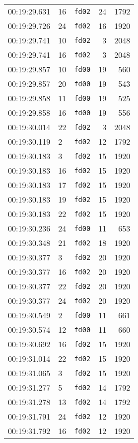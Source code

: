 \documentclass{article}
\begin{document}
\begin{longtable}{lllrr}
00:19:29.631 & 16 & \texttt{fd02} & 24 & 1792 \\
00:19:29.726 & 24 & \texttt{fd02} & 16 & 1920 \\
00:19:29.741 & 10 & \texttt{fd02} & 3 & 2048 \\
00:19:29.741 & 16 & \texttt{fd02} & 3 & 2048 \\
00:19:29.857 & 10 & \texttt{fd00} & 19 & 560 \\
00:19:29.857 & 20 & \texttt{fd00} & 19 & 543 \\
00:19:29.858 & 11 & \texttt{fd00} & 19 & 525 \\
00:19:29.858 & 16 & \texttt{fd00} & 19 & 556 \\
00:19:30.014 & 22 & \texttt{fd02} & 3 & 2048 \\
00:19:30.119 & 2 & \texttt{fd02} & 12 & 1792 \\
00:19:30.183 & 3 & \texttt{fd02} & 15 & 1920 \\
00:19:30.183 & 16 & \texttt{fd02} & 15 & 1920 \\
00:19:30.183 & 17 & \texttt{fd02} & 15 & 1920 \\
00:19:30.183 & 19 & \texttt{fd02} & 15 & 1920 \\
00:19:30.183 & 22 & \texttt{fd02} & 15 & 1920 \\
00:19:30.236 & 24 & \texttt{fd00} & 11 & 653 \\
00:19:30.348 & 21 & \texttt{fd02} & 18 & 1920 \\
00:19:30.377 & 3 & \texttt{fd02} & 20 & 1920 \\
00:19:30.377 & 16 & \texttt{fd02} & 20 & 1920 \\
00:19:30.377 & 22 & \texttt{fd02} & 20 & 1920 \\
00:19:30.377 & 24 & \texttt{fd02} & 20 & 1920 \\
00:19:30.549 & 2 & \texttt{fd00} & 11 & 661 \\
00:19:30.574 & 12 & \texttt{fd00} & 11 & 660 \\
00:19:30.692 & 16 & \texttt{fd02} & 15 & 1920 \\
00:19:31.014 & 22 & \texttt{fd02} & 15 & 1920 \\
00:19:31.065 & 3 & \texttt{fd02} & 15 & 1920 \\
00:19:31.277 & 5 & \texttt{fd02} & 14 & 1792 \\
00:19:31.278 & 13 & \texttt{fd02} & 14 & 1792 \\
00:19:31.791 & 24 & \texttt{fd02} & 12 & 1920 \\
00:19:31.792 & 16 & \texttt{fd02} & 12 & 1920 \\

\end{longtable}
\end{document}
